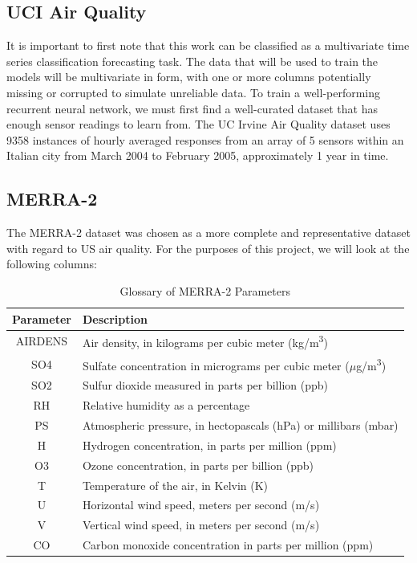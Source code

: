 \documentclass[12pt]{article}
\begin{document}
\subsection{UCI Air Quality}
It is important to first note that this work can be classified as a multivariate time series classification forecasting task. The data that will be used to train the models will be multivariate in form, with one or more columns potentially missing or corrupted to simulate unreliable data.
To train a well-performing recurrent neural network, we must first find a well-curated dataset that has enough sensor readings to learn from. The UC Irvine Air Quality dataset \cite{misc_air_quality_360} uses 9358 instances of hourly averaged responses from an array of 5 sensors within an Italian city from March 2004 to February 2005, approximately 1 year in time.
\subsection{MERRA-2} 
The MERRA-2 \cite{gelaro2017modern} dataset was chosen as a more complete and representative dataset with regard to US air quality. For the purposes of this project, we will look at the following columns:
    \begin{table}[h]
    \centering
    \begin{tabular}{|c|p{10cm}|}
        \hline
        \textbf{Parameter} & \textbf{Description} \\
        \hline
        \hline
        AIRDENS & Air density, in kilograms per cubic meter (kg/m\textsuperscript{3}) \\
        \hline
        SO4 & Sulfate concentration in micrograms per cubic meter ($\mu$g/m\textsuperscript{3}) \\
        \hline
        SO2 & Sulfur dioxide measured in parts per billion (ppb) \\
        \hline
        RH & Relative humidity as a percentage \\
        \hline
        PS & Atmospheric pressure, in hectopascals (hPa) or millibars (mbar) \\
        \hline
        H & Hydrogen concentration, in parts per million (ppm) \\
        \hline
        O3 & Ozone concentration, in parts per billion (ppb) \\
        \hline
        T & Temperature of the air, in Kelvin (K) \\
        \hline
        U & Horizontal wind speed, meters per second (m/s) \\
        \hline
        V & Vertical wind speed, in meters per second (m/s) \\
        \hline
        CO & Carbon monoxide concentration in parts per million (ppm) \\
        \hline
    \end{tabular}
    \caption{Glossary of MERRA-2 Parameters}
    \label{tab:merra-params}
\end{table}
\end{document}
